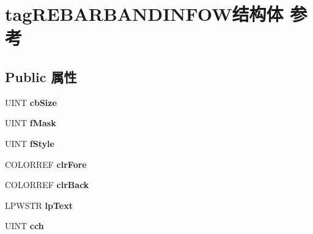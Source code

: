 \hypertarget{structtag_r_e_b_a_r_b_a_n_d_i_n_f_o_w}{}\section{tag\+R\+E\+B\+A\+R\+B\+A\+N\+D\+I\+N\+F\+O\+W结构体 参考}
\label{structtag_r_e_b_a_r_b_a_n_d_i_n_f_o_w}
\subsection*{Public 属性}
\begin{DoxyCompactItemize}
\item 
\mbox{\label{structtag_r_e_b_a_r_b_a_n_d_i_n_f_o_w_a538679a2ec831ae3bee315cd36d59b3a}} 
U\+I\+NT {\bfseries cb\+Size}
\item 
\mbox{\label{structtag_r_e_b_a_r_b_a_n_d_i_n_f_o_w_a13eab92fd1e67b350b1bbe57d80c922d}} 
U\+I\+NT {\bfseries f\+Mask}
\item 
\mbox{\label{structtag_r_e_b_a_r_b_a_n_d_i_n_f_o_w_ab1b88187c7949188df28382389beb1e9}} 
U\+I\+NT {\bfseries f\+Style}
\item 
\mbox{\label{structtag_r_e_b_a_r_b_a_n_d_i_n_f_o_w_ad31f6cd8ef5eea332e50a50d535f2993}} 
C\+O\+L\+O\+R\+R\+EF {\bfseries clr\+Fore}
\item 
\mbox{\label{structtag_r_e_b_a_r_b_a_n_d_i_n_f_o_w_a9910e3764655da2f14052a957f63c9cb}} 
C\+O\+L\+O\+R\+R\+EF {\bfseries clr\+Back}
\item 
\mbox{\label{structtag_r_e_b_a_r_b_a_n_d_i_n_f_o_w_aa19f6dd0d2137331b634e0886bbd02f5}} 
L\+P\+W\+S\+TR {\bfseries lp\+Text}
\item 
\mbox{\label{structtag_r_e_b_a_r_b_a_n_d_i_n_f_o_w_aeefca3baa34ae0f73c727538bde9e5b3}} 
U\+I\+NT {\bfseries cch}
\item 
\mbox{\label{structtag_r_e_b_a_r_b_a_n_d_i_n_f_o_w_a35f38cfb89b7cd34fc91e5d6c344f0ed}} 

\end{DoxyCompactItemize}
